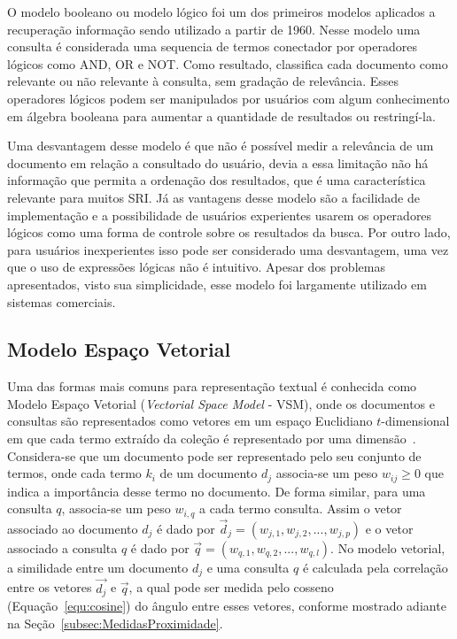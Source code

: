 O modelo booleano ou modelo lógico foi um dos primeiros modelos aplicados a recuperação informação sendo utilizado a partir de 1960. Nesse modelo uma consulta é considerada uma sequencia de termos conectador por operadores lógicos como AND, OR e NOT. Como resultado, classifica cada documento como relevante ou não relevante à consulta, sem gradação de relevância. Esses operadores lógicos podem ser manipulados por usuários com algum conhecimento em álgebra booleana para aumentar a quantidade de resultados ou restringí-la.

Uma desvantagem desse modelo é que não é possível medir a relevância de um documento em relação a consultado do usuário, devia a essa limitação não há informação que permita a ordenação dos resultados, que é uma característica relevante para muitos SRI.
Já as vantagens desse modelo são a facilidade de implementação e a possibilidade de usuários experientes usarem os operadores lógicos como uma forma de controle sobre os resultados da busca. Por outro lado, para usuários inexperientes isso pode ser considerado uma desvantagem, uma vez que o uso de expressões lógicas não é intuitivo. Apesar dos problemas apresentados, visto sua simplicidade, esse modelo foi largamente utilizado em sistemas comerciais. 



\subsection{Modelo Espaço Vetorial}
\label{subsec:modeloespacovetorial}

Uma das formas mais comuns para representação textual é conhecida como Modelo Espaço Vetorial (\textit{Vectorial Space Model} - VSM), onde os documentos e consultas são representados como vetores em um espaço Euclidiano $t$-dimensional em que cada termo extraído da coleção é representado por uma dimensão~\cite{Rezende2003}. 
% 
Considera-se que um documento pode ser representado pelo seu conjunto de termos, onde cada termo $k_i$ de um documento $d_j$ associa-se um peso $w_{ij}\geq0$ que indica a importância desse termo no documento. 
%
De forma similar, para uma consulta $q$, associa-se um peso $w_{i,q}$ a cada termo consulta. 
%
Assim o vetor associado ao documento $d_j$ é dado por $\vec{d}_{j} = (w_{j,1}, w_{j,2}, ..., w_{j,p})$ 
%
e o vetor associado a consulta $q$ é dado por $\vec{q} = (w_{q,1}, w_{q,2}, ..., w_{q,l})$.
%
No modelo vetorial, a similidade entre um documento $d_j$ e uma consulta $q$ é calculada pela correlação entre os vetores $\vec{d_j}$ e $\vec{q}$, a qual pode ser medida pelo cosseno (Equação~\ref{equ:cosine}) do ângulo entre esses vetores, conforme mostrado adiante na Seção~\ref{subsec:MedidasProximidade}. 



